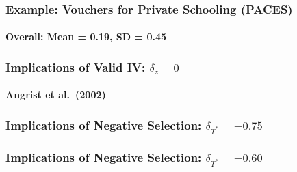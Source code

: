 \documentclass{beamer}
\begin{document}
\begin{frame}
  \frametitle{Example: Vouchers for Private Schooling (PACES)}
  \framesubtitle{Overall: Mean = 0.19, SD = 0.45}
\begin{figure}[h]
  \scriptsize
  \begingroup
  \centering
  
  \endgroup
\end{figure}
\end{frame}
\begin{frame}
  \frametitle{Implications of Valid IV: $\delta_z = 0$}
  \framesubtitle{Angrist et al.\ (2002)}
\begin{figure}[h]
  \scriptsize
  \begingroup
  \centering
  
  \endgroup
\end{figure}
\end{frame}
\begin{frame}
  \frametitle{Implications of Negative Selection: $\delta_{T^*} = -0.75$}
\begin{figure}[h]
  \scriptsize
  \begingroup
  \centering
  
  \endgroup
\end{figure}
\end{frame}
\begin{frame}
  \frametitle{Implications of Negative Selection: $\delta_{T^*} = -0.60$}
\begin{figure}[h]
  \scriptsize
  \begingroup
  \centering
  
  \endgroup
\end{figure}
\end{frame}
\end{document}
